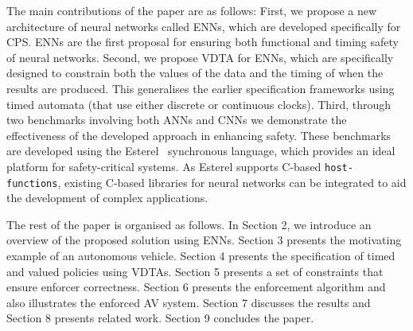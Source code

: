 The main contributions of the paper are as follows: First, we propose
a new architecture of neural networks called \acfp{ENN},
which are developed specifically for CPS. \acp{ENN} are the first proposal
for ensuring both functional and timing safety of neural
networks. Second, we propose \ac{VDTA} for \acp{ENN},
which are specifically designed to constrain both the values of the
data and the timing of when the results are
produced. This generalises the earlier specification frameworks using
timed automata (that use either discrete or continuous clocks). Third,
through two benchmarks involving both \acp{ANN} and \acp{CNN} we demonstrate
the effectiveness of the developed approach in enhancing safety. 
These benchmarks are developed using the Esterel~\cite{Berry00}
synchronous language, which provides an ideal platform for 
safety-critical systems. As Esterel supports C-based
\texttt{host-functions}, 
existing C-based libraries for neural networks can be
integrated to aid the development of
complex applications.

The rest of the paper is organised as follows. In Section 2, we introduce
an overview of the proposed solution using \acp{ENN}. Section 3
presents the motivating example of an autonomous
vehicle. Section 4 presents the specification of timed and valued
policies using \acp{VDTA}. Section 5 presents a set of constraints that ensure
enforcer correctness. Section 6 presents the enforcement algorithm and
also illustrates the enforced AV system. Section 7 discusses the
results and Section 8 presents related work. Section 9 concludes the
paper.

